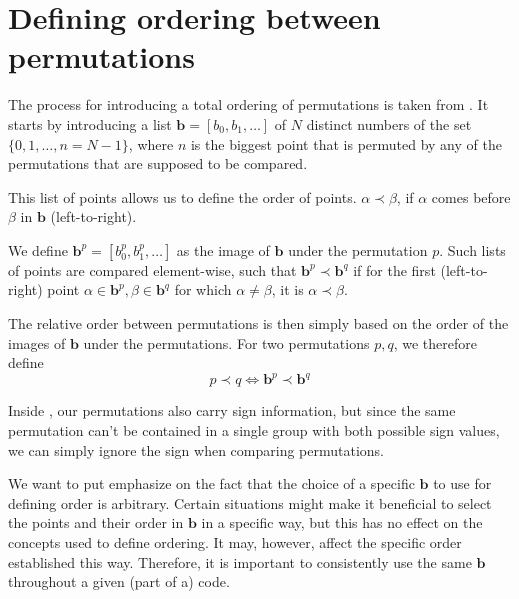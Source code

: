 \documentclass[parskip=half]{scrartcl}
\begin{document}
	\section{Defining ordering between permutations}
	\label{sec:OrderPermutations}

	The process for introducing a total ordering of permutations is taken from \textcite{Manssur2002a}. It starts by introducing a list $\mathbf{b} =
	[b_0, b_1, \ldots]$ of $N$ distinct numbers of the set $\{ 0, 1, \ldots, n = N - 1 \}$, where $n$ is the biggest point that is permuted by any of
	the permutations that are supposed to be compared.

	This list of points allows us to define the order of points. $\alpha \prec \beta$, if $\alpha$ comes before $\beta$ in $\mathbf{b}$
	(left-to-right).\supercite{Manssur2002a}

	We define $\mathbf{b}^p = [ b_0^p, b_1^p, \ldots ]$ as the image of $\mathbf{b}$ under the permutation $p$. Such lists of points are compared
	element-wise, such that $\mathbf{b}^p \prec \mathbf{b}^q$ if for the first (left-to-right) point $\alpha \in \mathbf{b}^p, \beta \in \mathbf{b}^q$
	for which $\alpha \neq \beta$, it is $\alpha \prec \beta$.\supercite{Manssur2002a}

	The relative order between permutations is then simply based on the order of the images of $\mathbf{b}$ under the permutations. For two
	permutations $p,q$, we therefore define\supercite{Manssur2002a}
	\begin{equation}
		p \prec q \iff \mathbf{b}^p \prec \mathbf{b}^q
	\end{equation}

	Inside , our permutations also carry sign information, but since the same permutation can't be contained in a single group with both
	possible sign values\supercite{Manssur2002a}, we can simply ignore the sign when comparing permutations.\supercite{Manssur2002a}

	We want to put emphasize on the fact that the choice of a specific $\mathbf{b}$ to use for defining order is arbitrary. Certain situations might
	make it beneficial to select the points and their order in $\mathbf{b}$ in a specific way, but this has no effect on the concepts used to define
	ordering. It may, however, affect the specific order established this way. Therefore, it is important to consistently use the same $\mathbf{b}$
	throughout a given (part of a) code.


	\cleardoublepage
	\printbibliography
\end{document}
